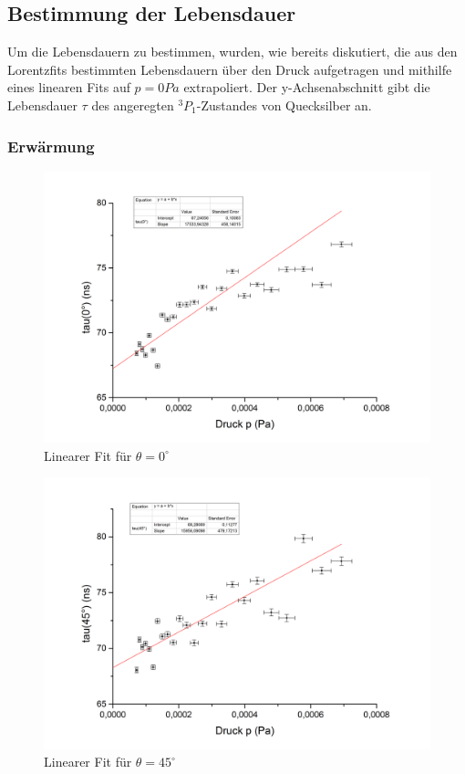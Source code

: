 \subsection{Bestimmung der Lebensdauer}
Um die Lebensdauern zu bestimmen, wurden, wie bereits diskutiert, die aus den Lorentzfits bestimmten Lebensdauern über den Druck aufgetragen und mithilfe eines linearen Fits auf $p=0Pa$ extrapoliert. Der y-Achsenabschnitt gibt die Lebensdauer $\tau$ des angeregten $^{3}P_{1}$-Zustandes von Quecksilber an. 
\subsubsection{Erwärmung}
\begin{figure}[h]
\begin{center}
\includegraphics[scale=0.5]{Bilder/erwaermung_0}
\caption{Linearer Fit für $\theta=0^{\circ}$}
\end{center}
\end{figure}
\begin{figure}[h]
\begin{center}
\includegraphics[scale=0.5]{Bilder/erwaermung_45}
\caption{Linearer Fit für $\theta=45^{\circ}$}
\end{center}
\end{figure}

